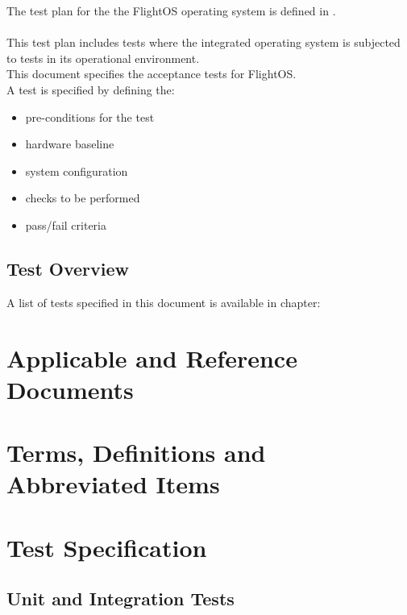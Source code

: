 The test plan for the the FlightOS operating system is defined in
\cite{flightosTP}.\\
\\

\noindent
This test plan includes tests where the integrated operating
system is subjected to tests in its operational environment.\\

\noindent
This document specifies the acceptance tests for FlightOS.\\

\noindent
A test is specified by defining the:
\begin{itemize}
	\item pre-conditions for the test
	\item hardware baseline
	\item system configuration
	\item checks to be performed
	\item pass/fail criteria
\end{itemize}



\section{Test Overview}

A list of tests specified in this document is available in chapter:


\chapter{Applicable and Reference Documents} %

\printbibliography[heading=none]


\chapter{Terms, Definitions and Abbreviated Items}

\printglossary[type=acronym]
\printglossary[type=main, style=altlist]


\chapter{Test Specification}

\section{Unit and Integration Tests}


